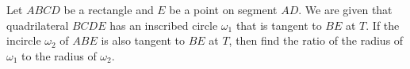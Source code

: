 Let $ABCD$ be a rectangle and $E$ be a point on segment $AD$. We are given that quadrilateral $BCDE$ has an inscribed circle $\omega_1$ that is tangent to $BE$ at $T$. If the incircle $\omega_2$ of $ABE$ is also tangent to $BE$ at $T$, then find the ratio of the radius of $\omega_1$ to the radius of $\omega_2$.

